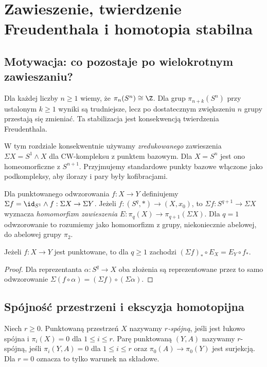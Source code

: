\chapter{Zawieszenie, twierdzenie Freudenthala i homotopia stabilna}
\label{ch:stabilna-v8}

\section{Motywacja: co pozostaje po wielokrotnym zawieszaniu?}
Dla każdej liczby $n\ge1$ wiemy, że
$\pi_n(S^n)\cong\Z$. Dla grup
$\pi_{n+k}(S^n)$ przy ustalonym $k\ge1$ wyniki
są trudniejsze, lecz po dostatecznym zwiększeniu $n$
grupy przestają się zmieniać. Ta stabilizacja jest
konsekwencją twierdzenia Freudenthala.

W tym rozdziale konsekwentnie używamy \emph{zredukowanego}
zawieszenia
$\Sigma X=S^1\wedge X$ dla CW-kompleksu z punktem
bazowym. Dla $X=S^n$ jest ono homeomorficzne z $S^{n+1}$.
Przyjmujemy standardowe punkty bazowe włączone jako
podkompleksy, aby ilorazy i pary były kofibracjami.

\begin{definicja}
Dla punktowanego odwzorowania $f:X\to Y$
definiujemy $\Sigma f=\id_{S^1}\wedge f:
\Sigma X\to\Sigma Y$.
Jeżeli $f:(S^q,*)\to(X,x_0)$, to
$\Sigma f:S^{q+1}\to\Sigma X$ wyznacza
\emph{homomorfizm zawieszenia}
$E:\pi_q(X)\to\pi_{q+1}(\Sigma X)$.
Dla $q=1$ odwzorowanie to rozumiemy jako
homomorfizm z grupy,
niekoniecznie abelowej, do abelowej grupy $\pi_2$.
\end{definicja}

\begin{stwierdzenie}[Naturalność]
Jeżeli $f:X\to Y$ jest punktowane, to dla $q\ge1$
zachodzi $(\Sigma f)_*\circ E_X=E_Y\circ f_*$.
\end{stwierdzenie}
\begin{proof}
Dla reprezentanta $\alpha:S^q\to X$ oba złożenia są
reprezentowane przez to samo odwzorowanie
$\Sigma(f\circ\alpha)=(\Sigma f)\circ(\Sigma\alpha)$.
\end{proof}

\section{Spójność przestrzeni i ekscyzja homotopijna}
\begin{definicja}[$r$-spójność]
Niech $r\ge0$. Punktowaną przestrzeń $X$ nazywamy
\emph{$r$-spójną}, jeśli jest łukowo spójna i
$\pi_i(X)=0$ dla $1\le i\le r$.
Parę punktowaną $(Y,A)$ nazywamy $r$-spójną,
jeśli $\pi_i(Y,A)=0$ dla $1\le i\le r$
oraz $\pi_0(A)\to\pi_0(Y)$ jest surjekcją.
Dla $r=0$ oznacza to tylko warunek na składowe.
\end{definicja}

